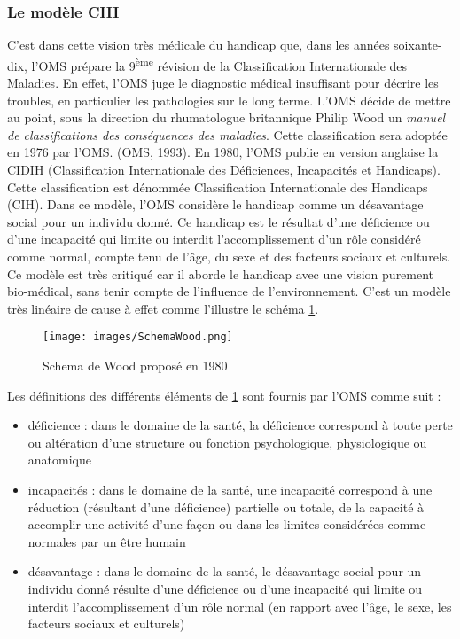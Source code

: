 \subsubsection{Le modèle CIH}
C'est dans cette vision très médicale du handicap que, dans les années soixante-dix, l'OMS prépare la 9\textsuperscript{ème} révision de la Classification Internationale des Maladies. En effet, l'OMS juge le diagnostic médical insuffisant pour décrire les troubles, en particulier les pathologies sur le long terme. L'OMS décide de mettre au point, sous la direction du rhumatologue britannique Philip Wood un \og \textit{manuel de classifications des conséquences des maladies}\fg{}. Cette classification sera adoptée en 1976 par l'OMS. (OMS, 1993).
En 1980, l'OMS publie en version anglaise la CIDIH (Classification Internationale des Déficiences, Incapacités et Handicaps). Cette classification est dénommée \og Classification Internationale des Handicaps (CIH)\fg{}. Dans ce modèle, l'OMS considère le handicap comme un désavantage social pour un individu donné. Ce handicap est le résultat d'une déficience ou d'une incapacité qui limite ou interdit l'accomplissement d'un rôle considéré comme normal, compte tenu de l'âge, du sexe et des facteurs sociaux et culturels. Ce modèle est très critiqué car il aborde le handicap avec une vision purement bio-médical, sans tenir compte de l'influence de l'environnement. C'est un modèle très linéaire de cause à effet comme l'illustre le schéma \ref{CIDIH1980}.

\begin{figure}[htbp]%
\begin{center}
\texttt{[image: images/SchemaWood.png]} 
\end{center}
\caption{Schema de Wood proposé en 1980}
\label{CIDIH1980}
\end{figure}

Les définitions des différents éléments de \ref{CIDIH1980} sont fournis par l'OMS comme suit : 
\begin{itemize}
\item déficience : dans le domaine de la santé, la déficience correspond à toute perte ou altération d'une structure ou fonction psychologique, physiologique ou anatomique
\item incapacités : dans le domaine de la santé, une incapacité correspond à une réduction (résultant d'une déficience) partielle ou totale, de la capacité à accomplir une activité d'une façon ou dans les limites considérées comme normales par un être humain
\item désavantage : dans le domaine de la santé, le désavantage social pour un individu donné résulte d'une déficience ou d'une incapacité qui limite ou interdit l'accomplissement d'un rôle normal (en rapport avec l'âge, le sexe, les facteurs sociaux et culturels)
\end{itemize}

